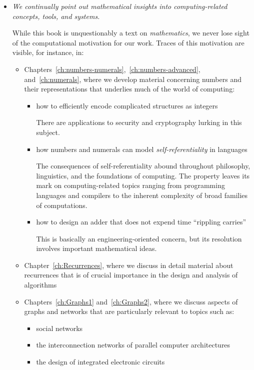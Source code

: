 \begin{itemize}
\item
{\em We continually point out mathematical insights into {\em computing-related} concepts, tools, and systems.}

\smallskip

While this book is unquestionably a text on {\em mathematics}, we never lose sight of the computational motivation for our work.  Traces of this motivation are visible, for instance, in:
  \begin{itemize}
  \item
Chapters~\ref{ch:numbers-numerals},~\ref{ch:numbers-advanced}, and~\ref{ch:numerals}, where we develop material concerning numbers and their representations that underlies much of the world of computing:
     \begin{itemize}
     \item
how to efficiently encode complicated structures as integers

\smallskip

There are applications to security and cryptography lurking in this subject.
     \item
how numbers and numerals can model {\em self-referentiality} in languages

\smallskip

The consequences of self-referentiality abound throughout philosophy, linguistics, and the foundations of computing.  The property leaves its mark on computing-related topics ranging from programming languages and compilers to the inherent complexity of broad families of computations.
     \item
how to design an adder that does not expend time ``rippling carries''

\smallskip

This is basically an engineering-oriented concern, but its resolution involves important mathematical ideas.
     \end{itemize}
  \item
Chapter~\ref{ch:Recurrences}, where we discuss in detail material about recurrences that is of crucial importance in the design and analysis of algorithms
  \item
Chapters~\ref{ch:Graphs1} and~\ref{ch:Graphs2}, where we discuss aspects of graphs and networks that are particularly relevant to topics such as:
     \begin{itemize}
     \item
social networks
     \item
the interconnection networks of parallel computer architectures
     \item
the design of integrated electronic circuits
     \end{itemize}
  \end{itemize}
  

\end{itemize}
